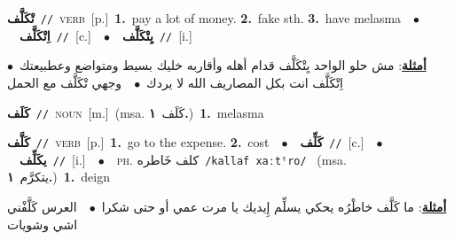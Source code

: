 \documentclass[10pt,a4paper,twoside]{article} %
\begin{document}
\begin{multicols}{2}
{\setlength\topsep{0pt}\textbf{\foreignlanguage{arabic}{تْكَلَّف}}\ {\color{gray}\texttt{//}\color{black}}\ \textsc{verb}\ [p.]\ \textbf{1.}~pay a lot of money.  \textbf{2.}~fake sth.  \textbf{3.}~have melasma\ \ $\bullet$\ \ \setlength\topsep{0pt}\textbf{\foreignlanguage{arabic}{اِتْكَلَّف}}\ {\color{gray}\texttt{//}\color{black}}\ [c.]\ \ $\bullet$\ \ \setlength\topsep{0pt}\textbf{\foreignlanguage{arabic}{يِتْكَلَّف}}\ {\color{gray}\texttt{//}\color{black}}\ [i.]\  \begin{flushright}\color{gray}\foreignlanguage{arabic}{\textbf{\underline{\foreignlanguage{arabic}{أمثلة}}}: مش حلو الواحد يِتْكَلَّف قدام أهله وأقاربه خليك بسيط ومتواضع وعطبيعتك\ $\bullet$\ \  اِتْكَلَّف انت بكل المصاريف الله لا يردك\ $\bullet$\ \  وجهي تْكَلَّف مع الحمل}\end{flushright}\color{black}} \vspace{2mm}

{\setlength\topsep{0pt}\textbf{\foreignlanguage{arabic}{كَلَف}}\ {\color{gray}\texttt{//}\color{black}}\ \textsc{noun}\ [m.]\ \color{gray}(msa. \foreignlanguage{arabic}{كَلَف}~\foreignlanguage{arabic}{\textbf{١.}})\color{black}\ \textbf{1.}~melasma\ } \vspace{2mm}

{\setlength\topsep{0pt}\textbf{\foreignlanguage{arabic}{كَلَّف}}\ {\color{gray}\texttt{//}\color{black}}\ \textsc{verb}\ [p.]\ \textbf{1.}~go to the expense.  \textbf{2.}~cost\ \ $\bullet$\ \ \setlength\topsep{0pt}\textbf{\foreignlanguage{arabic}{كَلِّف}}\ {\color{gray}\texttt{//}\color{black}}\ [c.]\ \ $\bullet$\ \ \setlength\topsep{0pt}\textbf{\foreignlanguage{arabic}{يكَلِّف}}\ {\color{gray}\texttt{//}\color{black}}\ [i.]\ \ $\bullet$\ \ \textsc{ph.} \color{gray} \foreignlanguage{arabic}{كلف خَاطره}\color{black}\ {\color{gray}\texttt{/{\sffamily kallaf xaːtˤro}/}\color{black}}\ \color{gray} (msa. \foreignlanguage{arabic}{يتكرَّم}~\foreignlanguage{arabic}{\textbf{١.}})\color{black}\ \textbf{1.}~deign\  \begin{flushright}\color{gray}\foreignlanguage{arabic}{\textbf{\underline{\foreignlanguage{arabic}{أمثلة}}}: ما كَلَّف خاطْرُه  يحكي يسلِّم إِيديك يا مرت عمي أو حتى شكرا\ $\bullet$\ \  العرس كَلَّفْني اشي وشويات}\end{flushright}\color{black}} \vspace{2mm}


\end{multicols}
\end{document}
